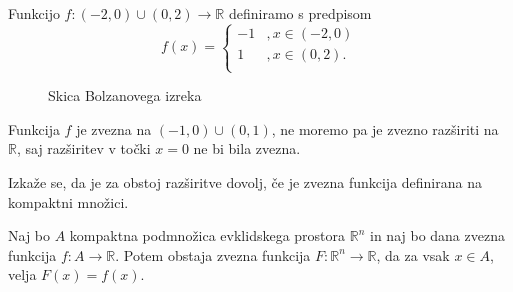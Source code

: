 \documentclass[mat1]{fmfdelo}
\newcommand{\R}{\mathbb R}
\newcommand{\0}{\underline{0}}
\begin{document}
\begin{primer}
Funkcijo $f : (-2, 0) \cup (0, 2) \to \R$ definiramo s predpisom
\[  f(x) = \left \{
\begin{array}{ll}
	-1 &, x \in (-2, 0)\\
	1 &, x \in (0, 2). \\
\end{array} 
\right. \]

\begin{figure}[h!]
	\centering
	\caption{Skica Bolzanovega izreka}
\end{figure}

Funkcija $f$ je zvezna na $(-1, 0) \cup (0, 1)$, ne moremo pa je zvezno razširiti na $\R$, saj razširitev v točki $x = 0$ ne bi bila zvezna.
\end{primer}

Izkaže se, da je za obstoj razširitve dovolj, če je zvezna funkcija definirana na kompaktni množici.

\begin{lema}\label{lem:razsiritev}
Naj bo $A$ kompaktna podmnožica evklidskega prostora $\R^n$ in naj bo dana zvezna funkcija $f : A \to \R$. Potem obstaja zvezna funkcija $F : \R^n \to \R$, da za vsak $x \in A$, velja $F(x) = f(x)$.
\end{lema}
\end{document}
